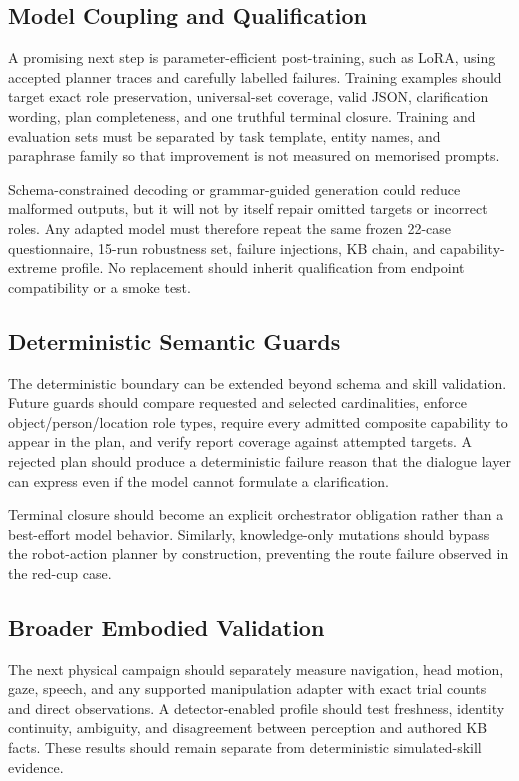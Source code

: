 \subsection{Model Coupling and Qualification}

A promising next step is parameter-efficient post-training, such as LoRA, using accepted planner traces and carefully labelled failures. Training examples should target exact role preservation, universal-set coverage, valid JSON, clarification wording, plan completeness, and one truthful terminal closure. Training and evaluation sets must be separated by task template, entity names, and paraphrase family so that improvement is not measured on memorised prompts.

Schema-constrained decoding or grammar-guided generation could reduce malformed outputs, but it will not by itself repair omitted targets or incorrect roles. Any adapted model must therefore repeat the same frozen 22-case questionnaire, 15-run robustness set, failure injections, KB chain, and capability-extreme profile. No replacement should inherit qualification from endpoint compatibility or a smoke test.

\subsection{Deterministic Semantic Guards}

The deterministic boundary can be extended beyond schema and skill validation. Future guards should compare requested and selected cardinalities, enforce object/person/location role types, require every admitted composite capability to appear in the plan, and verify report coverage against attempted targets. A rejected plan should produce a deterministic failure reason that the dialogue layer can express even if the model cannot formulate a clarification.

Terminal closure should become an explicit orchestrator obligation rather than a best-effort model behavior. Similarly, knowledge-only mutations should bypass the robot-action planner by construction, preventing the route failure observed in the red-cup case.

\subsection{Broader Embodied Validation}

The next physical campaign should separately measure navigation, head motion, gaze, speech, and any supported manipulation adapter with exact trial counts and direct observations. A detector-enabled profile should test freshness, identity continuity, ambiguity, and disagreement between perception and authored KB facts. These results should remain separate from deterministic simulated-skill evidence.

